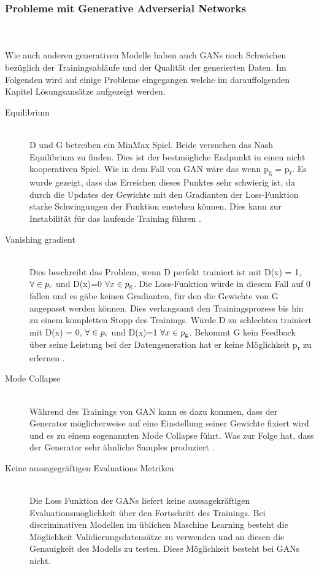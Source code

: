 \documentclass{llncs}
\begin{document}
\subsubsection{Probleme mit Generative Adverserial Networks}\label{sec:problemegan}
~\\\\
Wie auch anderen generativen Modelle haben auch GANs noch Schwächen bezüglich der Trainingsabläufe und der Qualität der generierten Daten. Im Folgenden wird auf einige Probleme eingegangen welche im darauffolgenden Kapitel Lösungsansätze aufgezeigt werden. 
\\
\begin{description}	

\item[Equilibrium]
~\\
D und G betreiben ein MinMax Spiel. Beide versuchen das Nash Equilibrium zu finden. Dies ist der bestmögliche Endpunkt in einen nicht kooperativen Spiel. Wie in dem Fall von GAN wäre das wenn  p\textsubscript{g} = p\textsubscript{r}. Es wurde gezeigt, dass das Erreichen dieses Punktes sehr schwierig ist, da durch die Updates der Gewichte mit den Gradianten der Loss-Funktion starke Schwingungen der Funktion enstehen können. Dies kann zur Instabilität für das laufende Training führen \cite{improvingan}.   
\\
\item[Vanishing gradient]
~\\
Dies beschreibt das Problem, wenn D perfekt trainiert ist mit  D(x) = 1, $\forall \in p\textsubscript{r}$ und D(x)=0 $\forall x \in p \textsubscript{g}$. Die Loss-Funktion würde in diesem Fall auf 0 fallen und es gäbe keinen Gradianten, für den die Gewichte von G angepasst werden können. Dies verlangsamt den Trainingsprozess bis hin zu einem kompletten Stopp des Trainings. Würde D zu schlechten trainiert mit  D(x) = 0, $\forall \in p\textsubscript{r}$ und D(x)=1 $\forall x \in p \textsubscript{g}$. Bekommt G kein Feedback über seine Leistung bei der Datengeneration hat er keine Möglichkeit p\textsubscript{r} zu erlernen \cite{improvingan}.
\\
\item[Mode Collapse]
~\\
Während des Trainings von GAN kann es dazu kommen, dass der Generator möglicherweise auf eine Einstellung seiner Gewichte fixiert wird und es zu einem sogenannten Mode Collapse führt. Was zur Folge hat, dass der Generator sehr ähnliche Samples produziert \cite{wasserstein}.
\\
\item[Keine aussagegräftigen Evaluations Metriken]
~\\
Die Loss Funktion der GANs liefert keine aussagekräftigen Evaluationsmöglichkeit über den Fortschritt des Trainings. Bei  discriminativen Modellen im üblichen Maschine Learning besteht die Möglichkeit Validierungsdatensätze zu verwenden und an diesen die Genauigkeit des Modells zu testen. Diese Möglichkeit besteht bei GANs nicht\cite{metrics}.
\end{description}
\end{document}
